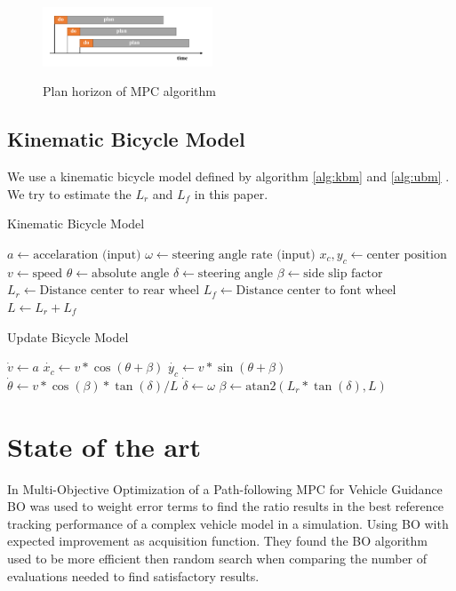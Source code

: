 \documentclass[twoside,twocolumn]{article}
\begin{document}
\begin{figure}[h]
    \caption{Plan horizon of MPC algorithm}
    \centering
    \includegraphics[width=0.45\textwidth]{fig_mpc_plan.pdf}
    \label{fig:mpc_plan}
\end{figure}

\subsection{Kinematic Bicycle Model}

We use a kinematic bicycle model defined by algorithm \ref{alg:kbm} and \ref{alg:ubm} \cite{kinematicBicycleModel}. We try to estimate the $L_r$ and $L_f$ in this paper.
\begin{algorithm}
    \caption{Kinematic Bicycle Model}
    \label{alg:kbm}
    \begin{algorithmic}
        \State $a \gets \text{accelaration (input)}$
        \State $\omega \gets \text{steering angle rate (input)}$
        \State $x_c, y_c \gets \text{center position}$
        \State $v \gets \text{speed}$
        \State $\theta \gets \text{absolute angle}$
        \State $\delta \gets \text{steering angle}$
        \State $\beta \gets \text{side slip factor}$
        \State $L_r \gets \text{Distance center to rear wheel}$
        \State $L_f \gets \text{Distance center to font wheel}$
        \State $L \gets L_r + L_f$
    \end{algorithmic}
\end{algorithm}

\begin{algorithm}
    \caption{Update Bicycle Model}
    \label{alg:ubm}
    \begin{algorithmic}
        \State $\dot{v} \gets a$
        \State $\dot{x_c} \gets v * \cos{(\theta + \beta)}$
        \State $\dot{y_c} \gets v * \sin{(\theta + \beta)}$
        \State $\dot{\theta} \gets v * \cos{(\beta)} * \tan{(\delta)} / L$
        \State $\dot{\delta} \gets \omega$
        \State $\beta \gets \text{atan2}(L_r * \tan{(\delta)}, L)$
    \end{algorithmic}
\end{algorithm}

\section{State of the art}
In Multi-Objective Optimization of a Path-following MPC for Vehicle Guidance \cite{gharib2021multi} BO was used to weight error terms to find the ratio results in the best reference tracking performance of a complex vehicle model in a simulation. Using BO with expected improvement as acquisition function. They found the BO algorithm used to be more efficient then random search when comparing the number of evaluations needed to find satisfactory results.
\end{document}
